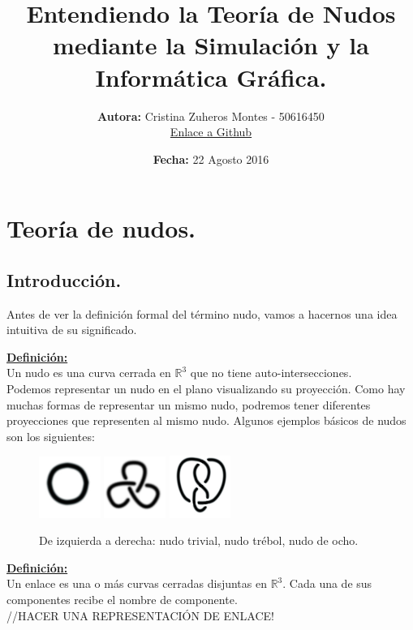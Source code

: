 \documentclass[14pt]{extarticle}
\title{Entendiendo la Teoría de Nudos mediante la Simulación y la Informática Gráfica.}
\author{\textbf{ Autora:} Cristina Zuheros Montes - 50616450\\
	    \href{https://github.com/cristinazuhe}{Enlace a Github}}
\date{\textbf{Fecha:} 22 Agosto 2016}
\begin{document}
\maketitle

\tableofcontents

\newpage
\section{Teoría de nudos. }\label{PrimerTema}

\subsection{Introducción.}
Antes de ver la definición formal del término nudo, vamos a hacernos una idea intuitiva de su significado.

  
\underline{\textbf{Definición:}}\\
 Un nudo es una curva cerrada en $\mathds{R}^{3}$ que no tiene auto-intersecciones.\\

Podemos representar un nudo en el plano visualizando su proyección. Como hay muchas formas de representar un mismo nudo, podremos tener diferentes proyecciones que representen al mismo nudo. 
 Algunos ejemplos básicos de nudos son los siguientes:
 
  \begin{figure}[h!]
  	\includegraphics[width=2cm]{1.jpg}
  	\includegraphics[width=2cm]{3f.png} 
  	\includegraphics[width=2cm]{fig8.jpg}
  	\centering
  	\caption{De izquierda a derecha: nudo trivial, nudo trébol, nudo de ocho.}
  	\label{uno} 
  \end{figure}
  
    \underline{\textbf{Definición:}}\\
     Un enlace es una o más curvas cerradas disjuntas en $\mathds{R}^{3}$. Cada una de sus componentes recibe el nombre de componente.\\
    //HACER UNA REPRESENTACIÓN DE ENLACE!
    
\end{document}
